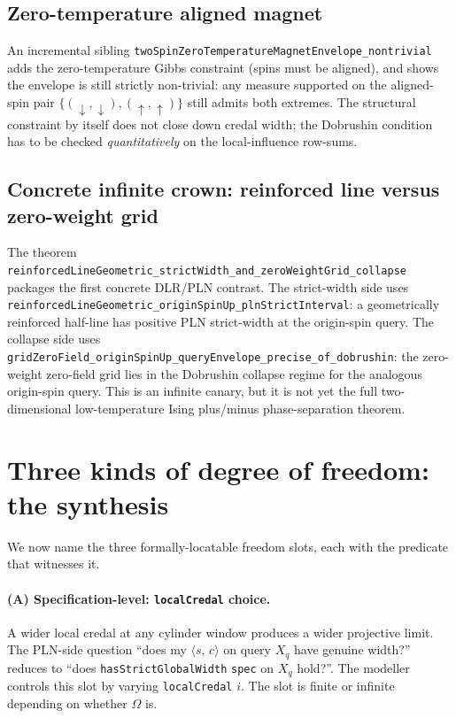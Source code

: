 \documentclass[]{article}
\newcommand{\lid}[1]{{\ttfamily\nolinkurl{#1}}}
\newcommand{\STV}[2]{\langle #1,\, #2 \rangle}
\begin{document}
\subsection{Zero-temperature aligned magnet}

An incremental sibling
\lid{twoSpinZeroTemperatureMagnetEnvelope\_nontrivial} adds the
zero-temperature Gibbs constraint (spins must be aligned), and shows
the envelope is still strictly non-trivial: any measure supported on
the aligned-spin pair $\{(\downarrow,\downarrow), (\uparrow,\uparrow)\}$
still admits both extremes. The structural constraint by itself does
not close down credal width; the Dobrushin condition has to be checked
\emph{quantitatively} on the local-influence row-sums.

\subsection{Concrete infinite crown: reinforced line versus zero-weight grid}

The theorem
\lid{reinforcedLineGeometric\_strictWidth\_and\_zeroWeightGrid\_collapse}
packages the first concrete DLR/PLN contrast. The strict-width side uses
\lid{reinforcedLineGeometric\_originSpinUp\_plnStrictInterval}: a
geometrically reinforced half-line has positive PLN strict-width at the
origin-spin query. The collapse side uses
\lid{gridZeroField\_originSpinUp\_queryEnvelope\_precise\_of\_dobrushin}:
the zero-weight zero-field grid lies in the Dobrushin collapse regime for
the analogous origin-spin query. This is an infinite canary, but it is not
yet the full two-dimensional low-temperature Ising plus/minus
phase-separation theorem.

\section{Three kinds of degree of freedom: the synthesis}\label{sec:synthesis}

We now name the three formally-locatable freedom slots, each with the
predicate that witnesses it.

\paragraph{(A) Specification-level: \lid{localCredal} choice.}
A wider local credal at any cylinder window produces a wider projective
limit. The PLN-side question ``does my $\STV{s}{c}$ on query $X_q$ have
genuine width?'' reduces to ``does \lid{hasStrictGlobalWidth}
\lid{spec} on $X_q$ hold?''. The modeller controls this slot by varying
\lid{localCredal}{} $i$. The slot is finite or infinite depending on
whether $\Omega$ is.
\end{document}
